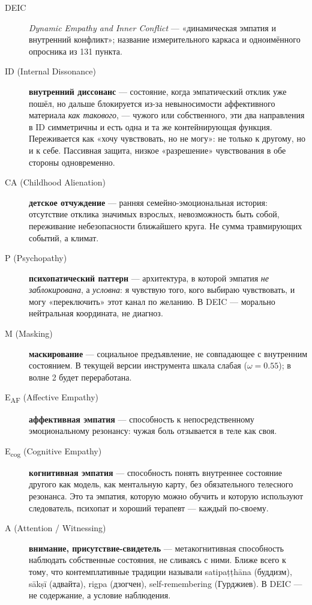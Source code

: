 \begin{description}
    \item[DEIC] \textit{Dynamic Empathy and Inner Conflict} --- «динамическая эмпатия и внутренний конфликт»; название измерительного каркаса и одноимённого опросника из 131 пункта.
    \item[ID (Internal Dissonance)] \textbf{внутренний диссонанс} --- состояние, когда эмпатический отклик уже пошёл, но дальше блокируется из-за невыносимости аффективного материала \emph{как такового}, --- чужого или собственного, эти два направления в ID симметричны и есть одна и та же контейнирующая функция. Переживается как «хочу чувствовать, но не могу»: не только к другому, но и к себе. Пассивная защита, низкое «разрешение» чувствования в обе стороны одновременно.
    \item[CA (Childhood Alienation)] \textbf{детское отчуждение} --- ранняя семейно-эмоциональная история: отсутствие отклика значимых взрослых, невозможность быть собой, переживание небезопасности ближайшего круга. Не сумма травмирующих событий, а климат.
    \item[P (Psychopathy)] \textbf{психопатический паттерн} --- архитектура, в которой эмпатия \emph{не заблокирована}, а \emph{условна}: я чувствую того, кого выбираю чувствовать, и могу «переключить» этот канал по желанию. В DEIC --- морально нейтральная координата, не диагноз.
    \item[M (Masking)] \textbf{маскирование} --- социальное предъявление, не совпадающее с внутренним состоянием. В текущей версии инструмента шкала слабая ($\omega = 0.55$); в волне 2 будет переработана.
    \item[E\textsubscript{AF} (Affective Empathy)] \textbf{аффективная эмпатия} --- способность к непосредственному эмоциональному резонансу: чужая боль отзывается в теле как своя.
    \item[E\textsubscript{cog} (Cognitive Empathy)] \textbf{когнитивная эмпатия} --- способность понять внутреннее состояние другого как модель, как ментальную карту, без обязательного телесного резонанса. Это та эмпатия, которую можно обучить и которую используют следователь, психопат и хороший терапевт --- каждый по-своему.
    \item[A (Attention / Witnessing)] \textbf{внимание, присутствие-свидетель} --- метакогнитивная способность наблюдать собственные состояния, не сливаясь с ними. Ближе всего к тому, что контемплативные традиции называли satipa\d{t}\d{t}h\=ana (буддизм), s\=ak\d{s}\=i (адвайта), rigpa (дзогчен), self-remembering (Гурджиев). В DEIC --- не содержание, а условие наблюдения.
\end{description}

